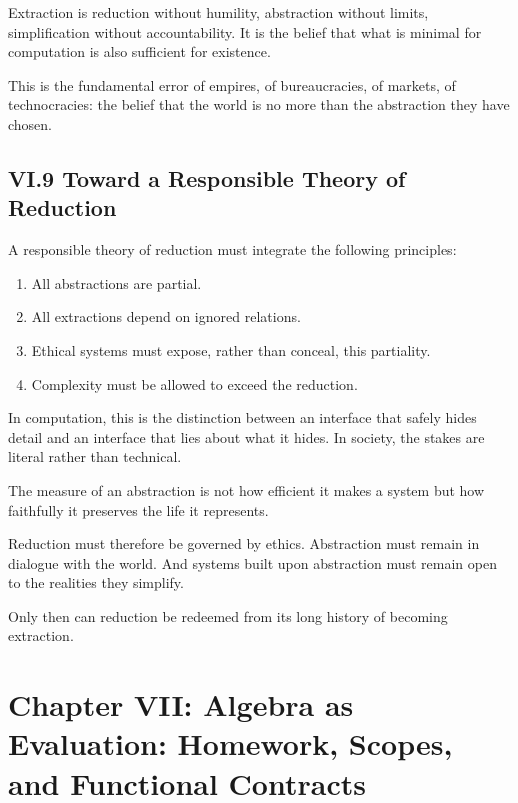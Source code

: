 \documentclass[12pt,letterpaper]{article}
\begin{document}
Extraction is reduction without humility, abstraction without limits, simplification without accountability. It is the belief that what is minimal for computation is also sufficient for existence.

This is the fundamental error of empires, of bureaucracies, of markets, of technocracies: the belief that the world is no more than the abstraction they have chosen.

\subsection{VI.9 Toward a Responsible Theory of Reduction}

A responsible theory of reduction must integrate the following principles:

\begin{enumerate}
    \item All abstractions are partial.
    \item All extractions depend on ignored relations.
    \item Ethical systems must expose, rather than conceal, this partiality.
    \item Complexity must be allowed to exceed the reduction.
\end{enumerate}

In computation, this is the distinction between an interface that safely hides detail and an interface that lies about what it hides. In society, the stakes are literal rather than technical.

The measure of an abstraction is not how efficient it makes a system but how faithfully it preserves the life it represents.

Reduction must therefore be governed by ethics. Abstraction must remain in dialogue with the world. And systems built upon abstraction must remain open to the realities they simplify.

Only then can reduction be redeemed from its long history of becoming extraction.

\newpage
\section{Chapter VII: Algebra as Evaluation: Homework, Scopes, and Functional Contracts}
\end{document}
